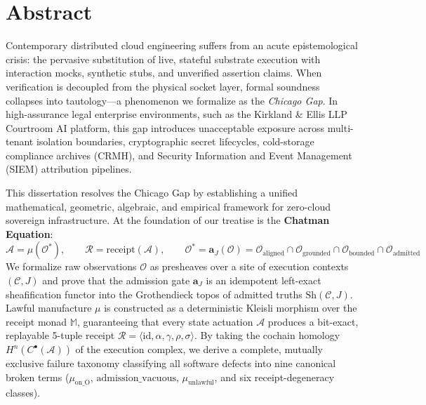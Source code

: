 \documentclass[10pt,twoside,openany]{book}
\theoremstyle{plain}
\theoremstyle{definition}
\theoremstyle{remark}
\newcommand{\Oraw}{\mathcal{O}}
\newcommand{\Oadm}{\mathcal{O}^*}
\newcommand{\Act}{\mathcal{A}}
\newcommand{\Rec}{\mathcal{R}}
\begin{document}
\chapter*{Abstract}

Contemporary distributed cloud engineering suffers from an acute epistemological crisis: the pervasive substitution of live, stateful substrate execution with interaction mocks, synthetic stubs, and unverified assertion claims. When verification is decoupled from the physical socket layer, formal soundness collapses into tautology---a phenomenon we formalize as the \emph{Chicago Gap}. In high-assurance legal enterprise environments, such as the Kirkland \& Ellis LLP Courtroom AI platform, this gap introduces unacceptable exposure across multi-tenant isolation boundaries, cryptographic secret lifecycles, cold-storage compliance archives (CRMH), and Security Information and Event Management (SIEM) attribution pipelines.

This dissertation resolves the Chicago Gap by establishing a unified mathematical, geometric, algebraic, and empirical framework for zero-cloud sovereign infrastructure. At the foundation of our treatise is the \textbf{Chatman Equation}:
\[
\Act = \mu(\Oadm), \qquad \Rec = \mathrm{receipt}(\Act), \qquad \Oadm = \mathbf{a}_J(\Oraw) = \Oraw_{\mathrm{aligned}} \cap \Oraw_{\mathrm{grounded}} \cap \Oraw_{\mathrm{bounded}} \cap \Oraw_{\mathrm{admitted}}
\]
We formalize raw observations $\Oraw$ as presheaves over a site of execution contexts $(\mathcal{C}, J)$ and prove that the admission gate $\mathbf{a}_J$ is an idempotent left-exact sheafification functor into the Grothendieck topos of admitted truths $\mathrm{Sh}(\mathcal{C}, J)$. Lawful manufacture $\mu$ is constructed as a deterministic Kleisli morphism over the receipt monad $\mathbb{M}$, guaranteeing that every state actuation $\Act$ produces a bit-exact, replayable 5-tuple receipt $\Rec = \langle \mathrm{id}, \alpha, \gamma, \rho, \sigma \rangle$. By taking the cochain homology $H^n(C^\bullet(\Act))$ of the execution complex, we derive a complete, mutually exclusive failure taxonomy classifying all software defects into nine canonical broken terms ($\mu_{\mathrm{on\_O}}$, $\mathrm{admission\_vacuous}$, $\mu_{\mathrm{unlawful}}$, and six receipt-degeneracy classes).
\end{document}
